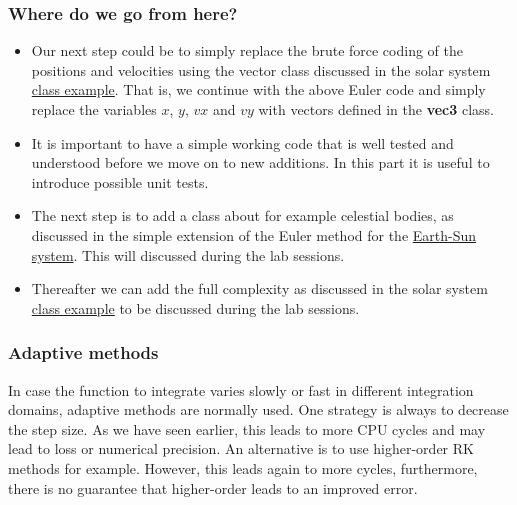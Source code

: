 \documentclass{beamer}
\begin{document}
\begin{frame}
\frametitle{Where do we go from here?}

\begin{block}{}

\begin{itemize}
\item Our next step could be to simply replace the brute force coding of the positions and velocities using the vector class discussed in the solar system  \href{{https://github.com/mortele/solar-system-fys3150}}{class example}. That is, we continue with the above Euler code and simply replace the variables $x$, $y$, $vx$ and $vy$ with vectors defined in the \textbf{vec3} class.

\item It is important to have a simple working code that is well tested and understood before we move on to new additions. In this part it is useful to introduce possible unit tests. 

\item The next step is to add a class about for example celestial bodies, as discussed in the simple extension of the Euler method for the \href{{https://github.com/andeplane/solar-system}}{Earth-Sun system}. This will discussed during the lab sessions.

\item Thereafter we can add the full complexity as discussed in the solar system \href{{https://github.com/mortele/solar-system-fys3150}}{class example} to be discussed during the lab sessions. 
\end{itemize}

\noindent
\end{block}
\end{frame}

\begin{frame}
\frametitle{Adaptive methods}

\begin{block}{}
In case the function to integrate varies slowly or fast in different integration domains, adaptive methods are normally used. One strategy is always to decrease the step size. As we have seen earlier, this leads to more CPU cycles and may lead to loss or numerical precision. An alternative is to use higher-order RK methods for example. However, this leads again to more cycles, furthermore, there is no guarantee that higher-order leads to an improved error.
\end{block}
\end{frame}
\end{document}
